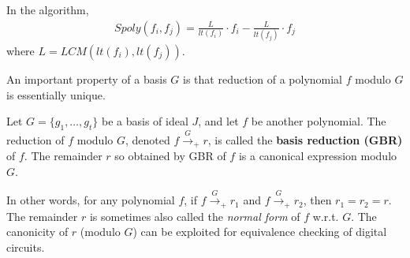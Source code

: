 In the algorithm,
\begin{equation}
\label{spoly}
\begin{split}
Spoly(f_i,f_j) = \frac{L}{lt(f_i)}\cdot f_i - \frac{L}{lt(f_j)}\cdot f_j
\end{split}
\end{equation}
where $L = LCM(lt(f_i),lt(f_j))$. 

An important property of a \Grobner basis $G$ is that reduction of a
polynomial $f$ modulo $G$ is essentially unique. 


\begin{Theorem} 
\label{thm:gbr}
Let $G=\{g_1,\dots,g_t\}$ be a \Grobner basis of ideal $J$, and let $f$
be another polynomial.  The reduction
of $f$ modulo $G$, denoted $f\xrightarrow{G}_+r$, is called the
{\bf \Grobner basis reduction (GBR)} of $f$. The remainder $r$
so obtained by GBR of $f$ is a {canonical expression
modulo $G$}.  
\end{Theorem}

In other words, for {any polynomial} $f$, if $f\xrightarrow{G}_+r_1$
and $f\xrightarrow{G}_+r_2$, then $r_1 = r_2=r$. 
The remainder $r$ is sometimes also called the {\it normal form} of
$f$ w.r.t. $G$. The canonicity of $r$ (modulo $G$) can be exploited
for equivalence checking of digital circuits. 



